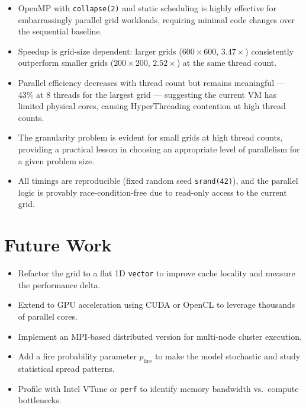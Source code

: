 \documentclass[12pt,a4paper]{article}
\begin{document}
\begin{itemize}
    \item OpenMP with \texttt{collapse(2)} and static scheduling is highly effective
          for embarrassingly parallel grid workloads, requiring minimal code changes
          over the sequential baseline.
    \item Speedup is grid-size dependent: larger grids ($600\times600$, $3.47\times$)
          consistently outperform smaller grids ($200\times200$, $2.52\times$) at the
          same thread count.
    \item Parallel efficiency decreases with thread count but remains meaningful ---
          43\% at 8 threads for the largest grid --- suggesting the current VM has
          limited physical cores, causing HyperThreading contention at high thread
          counts.
    \item The granularity problem is evident for small grids at high thread counts,
          providing a practical lesson in choosing an appropriate level of parallelism
          for a given problem size.
    \item All timings are reproducible (fixed random seed \texttt{srand(42)}), and the
          parallel logic is provably race-condition-free due to read-only access to the
          current grid.
\end{itemize}

\section{Future Work}

\begin{itemize}
    \item Refactor the grid to a flat 1D \texttt{vector} to improve cache locality
          and measure the performance delta.
    \item Extend to GPU acceleration using CUDA or OpenCL to leverage thousands of
          parallel cores.
    \item Implement an MPI-based distributed version for multi-node cluster execution.
    \item Add a fire probability parameter $p_{\text{fire}}$ to make the model
          stochastic and study statistical spread patterns.
    \item Profile with Intel VTune or \texttt{perf} to identify memory bandwidth vs.\
          compute bottlenecks.
\end{itemize}
\end{document}
